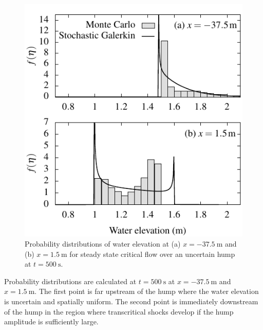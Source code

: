 \begin{figure}
    \centering
    \includegraphics{fig-criticalSteadyState-pdf.pdf}
    \caption{Probability distributions of water elevation at (a) $x = \SI{-37.5}{\meter}$ and (b) $x = \SI{1.5}{\meter}$ for steady state critical flow over an uncertain hump at $t = \SI{500}{\second}$.}
    \label{fig:criticalSteadyState-pdf}
\end{figure}

Probability distributions are calculated at $t = \SI{500}{\second}$ at $x = \SI{-37.5}{\meter}$ and $x = \SI{1.5}{\meter}$.
The first point is far upstream of the hump where the water elevation is uncertain and spatially uniform.
The second point is immediately downstream of the hump in the region where transcritical shocks develop if the hump amplitude is sufficiently large.

